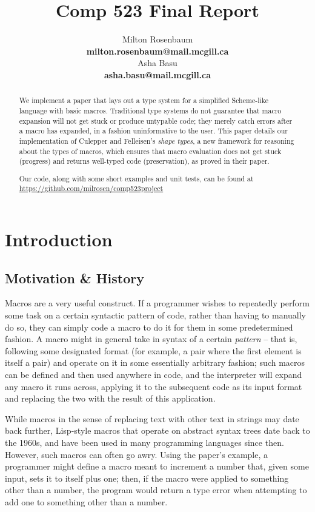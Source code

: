 \documentclass[11pt]{article}
\title{Comp 523 Final Report}
\author{Milton Rosenbaum \\
  \textbf{milton.rosenbaum@mail.mcgill.ca} \\\And
  Asha Basu \\
  \textbf{asha.basu@mail.mcgill.ca}}
\begin{document}
\maketitle
\begin{abstract}
We implement a paper \cite{10.1007/978-3-540-30175-2_12} that lays out a type system for a simplified Scheme-like language with basic macros. Traditional type systems do not guarantee that macro expansion will not get stuck or produce untypable code; they merely catch errors after a macro has expanded, in a fashion uninformative to the user. This paper details our implementation of Culepper and Felleisen's \textit{shape types}, a new framework for reasoning about the types of macros, which ensures that macro evaluation does not get stuck (progress) and returns well-typed code (preservation), as proved in their paper.

\par Our code, along with some short examples and unit tests, can be found at \url{https://github.com/milrosen/comp523project}
\end{abstract}

\section{Introduction}

\subsection{Motivation \& History}
Macros are a very useful construct. If a programmer wishes to repeatedly perform some task on a certain syntactic pattern of code, rather than having to manually do so, they can simply code a macro to do it for them in some predetermined fashion. A macro might in general take in syntax of a certain \textit{pattern} -- that is, following some designated format (for example, a pair where the first element is itself a pair) and operate on it in some essentially arbitrary fashion; such macros can be defined and then used anywhere in code, and the interpreter will expand any macro it runs across, applying it to the subsequent code as its input format and replacing the two with the result of this application.\par

While macros in the sense of replacing text with other text in strings may date back further, Lisp-style macros that operate on abstract syntax trees date back to the 1960s, and have been used in many programming languages since then. However, such macros can often go awry. Using the paper's example, a programmer might define a macro meant to increment a number that, given some input, sets it to itself plus one; then, if the macro were applied to something other than a number, the program would return a type error when attempting to add one to something other than a number.\par
\end{document}
